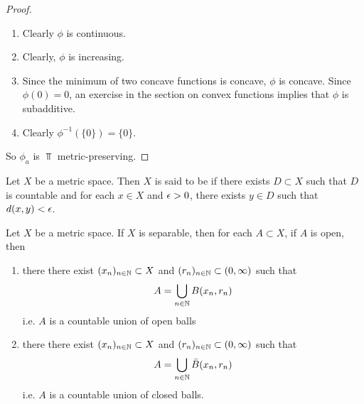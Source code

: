 \documentclass{book}
\begin{document}
\begin{proof}
	\begin{enumerate}
		\item Clearly $\phi$ is continuous.
		\item Clearly, $\phi$ is increasing. 
		\item Since the minimum of two concave functions is concave, $\phi$ is concave. Since $\phi(0) = 0$, an exercise in the section on convex functions implies that $\phi$ is subadditive. 
		\item Clearly $\phi^{-1}(\{0\}) = \{0\}$.	
	\end{enumerate}	
	So $\phi_a$ is $\Top$ metric-preserving.
\end{proof}






































\newpage
\begin{defn}
	Let $X$ be a metric space. Then $X$ is said to be  if there exists $D \subset X$ such that $D$ is countable and for each $x \in X$ and $\epsilon >0$, there exists $y \in D$ such that $d(x, y) < \epsilon$.
\end{defn}

\begin{ex}
	Let $X$ be a metric space. If $X$ is separable, then for each $A \subset X$, if $A$ is open, then 
	\begin{enumerate}
		\item there there exist $(x_n)_{n \in \mathbb{N}} \subset X$ and $(r_n)_{n \in \mathbb{N}} \subset (0, \infty)$ such that $$A = \bigcup\limits_{n \in \mathbb{N}} B(x_n, r_n)$$
		i.e. $A$ is a countable union of open balls
		\item there there exist $(x_n)_{n \in \mathbb{N}} \subset X$ and $(r_n)_{n \in \mathbb{N}} \subset (0, \infty)$ such that $$A = \bigcup\limits_{n \in \mathbb{N}} \bar{B}(x_n, r_n)$$
		i.e. $A$ is a countable union of closed balls.
	\end{enumerate}
\end{ex}
\end{document}
